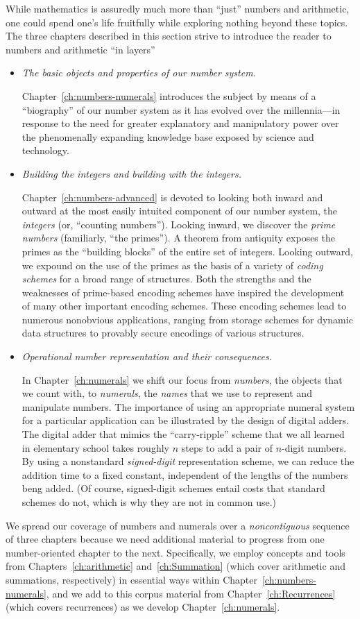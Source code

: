 While mathematics is assuredly much more than ``just'' numbers and
arithmetic, one could spend one's life fruitfully while exploring
nothing beyond these topics.  The three chapters described in this
section strive to introduce the reader to numbers and
arithmetic ``in layers''
\begin{itemize}
\item
{\em The basic objects and properties of our number system.}

Chapter~\ref{ch:numbers-numerals} introduces the subject by means of a
``biography'' of our number system as it has evolved over the
millennia---in response to the need for greater explanatory and
manipulatory power over the phenomenally expanding knowledge base
exposed by science and technology.
\item
{\em Building the integers and building with the integers.}

Chapter~\ref{ch:numbers-advanced} is devoted to looking both inward
and outward at the most easily intuited component of our number
system, the {\em integers} (or, ``counting numbers'').  Looking
inward, we discover the {\em prime numbers} (familiarly, ``the
primes'').  A theorem from antiquity exposes the primes as the
``building blocks'' of the entire set of integers.  Looking outward,
we expound on the use of the primes as the basis of a variety of {\em
  coding schemes} for a broad range of structures.  Both the strengths
and the weaknesses of prime-based encoding schemes have inspired the
development of many other important encoding schemes.  These encoding
schemes lead to numerous nonobvious applications, ranging from storage
schemes for dynamic data structures to provably secure encodings of
various structures.

\item
{\em Operational number representation and their consequences.}

In Chapter~\ref{ch:numerals} we shift our focus from {\em numbers},
the objects that we count with, to {\em numerals}, the {\em names}
that we use to represent and manipulate numbers.  The importance of
using an appropriate numeral system for a particular application can
be illustrated by the design of digital adders.  The digital adder
that mimics the ``carry-ripple'' scheme that we all learned in
elementary school takes roughly $n$ steps to add a pair of $n$-digit
numbers.  By using a nonstandard {\em signed-digit} representation
scheme, we can reduce the addition time to a fixed constant,
independent of the lengths of the numbers beng added.  (Of course,
signed-digit schemes entail costs that standard schemes do not, which
is why they are not in common use.)
\end{itemize}
We spread our coverage of numbers and numerals over a {\em
  noncontiguous} sequence of three chapters because we need additional
material to progress from one number-oriented chapter to the next.
Specifically, we employ concepts and tools from
Chapters~\ref{ch:arithmetic} and~\ref{ch:Summation} (which cover
arithmetic and summations, respectively) in essential ways within
Chapter~\ref{ch:numbers-numerals}, and we add to this corpus material
from Chapter~\ref{ch:Recurrences} (which covers recurrences) as we
develop Chapter~\ref{ch:numerals}.


